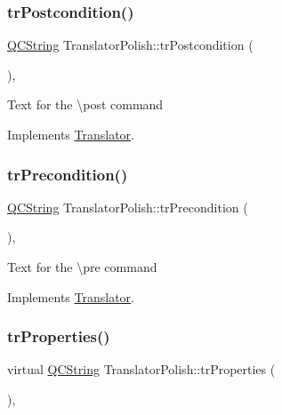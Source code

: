 \subsubsection{\texorpdfstring{trPostcondition()}{trPostcondition()}}
{\footnotesize\ttfamily \mbox{\hyperlink{class_q_c_string}{Q\+C\+String}} Translator\+Polish\+::tr\+Postcondition (\begin{DoxyParamCaption}{ }\end{DoxyParamCaption})\hspace{0.3cm}{\ttfamily [inline]}, {\ttfamily [virtual]}}

Text for the \textbackslash{}post command 

Implements \mbox{\hyperlink{class_translator}{Translator}}.

\mbox{\label{class_translator_polish_a8bae4d23fe88a88ecfa28b8ce6777e4a}} 
\subsubsection{\texorpdfstring{trPrecondition()}{trPrecondition()}}
{\footnotesize\ttfamily \mbox{\hyperlink{class_q_c_string}{Q\+C\+String}} Translator\+Polish\+::tr\+Precondition (\begin{DoxyParamCaption}{ }\end{DoxyParamCaption})\hspace{0.3cm}{\ttfamily [inline]}, {\ttfamily [virtual]}}

Text for the \textbackslash{}pre command 

Implements \mbox{\hyperlink{class_translator}{Translator}}.

\mbox{\label{class_translator_polish_a6f0eb5ca63099a11f7117e427760efb7}} 
\subsubsection{\texorpdfstring{trProperties()}{trProperties()}}
{\footnotesize\ttfamily virtual \mbox{\hyperlink{class_q_c_string}{Q\+C\+String}} Translator\+Polish\+::tr\+Properties (\begin{DoxyParamCaption}{ }\end{DoxyParamCaption})\hspace{0.3cm}{\ttfamily [inline]}, {\ttfamily [virtual]}}

